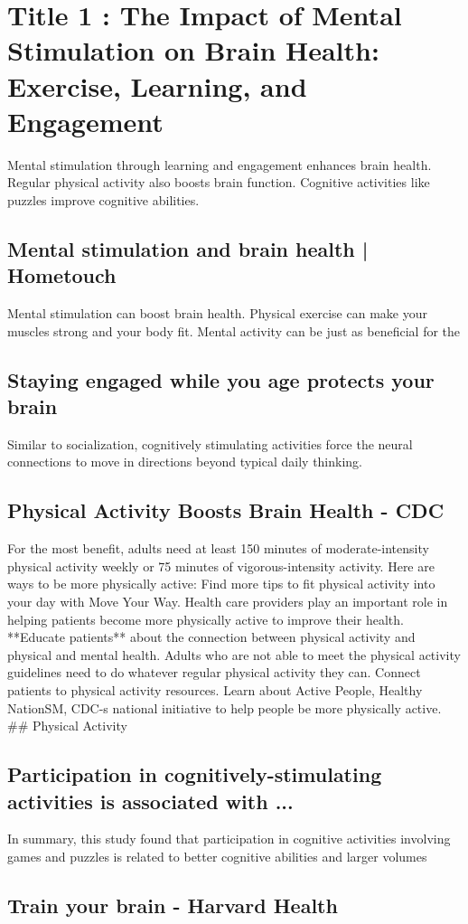 \documentclass[12pt]{article}
\begin{document}
\section{Title 1 : The Impact of Mental Stimulation on Brain Health: Exercise, Learning, and Engagement}
Mental stimulation through learning and engagement enhances brain health. Regular physical activity also boosts brain function. Cognitive activities like puzzles improve cognitive abilities.\subsection{Mental stimulation and brain health | Hometouch}
Mental stimulation can boost brain health. Physical exercise can make your muscles strong and your body fit. Mental activity can be just as beneficial for the\subsection{Staying engaged while you age protects your brain}
Similar to socialization, cognitively stimulating activities force the neural connections to move in directions beyond typical daily thinking.\subsection{Physical Activity Boosts Brain Health - CDC}
For the most benefit, adults need at least 150 minutes of moderate-intensity physical activity weekly or 75 minutes of vigorous-intensity activity. Here are ways to be more physically active: Find more tips to fit physical activity into your day with Move Your Way. Health care providers play an important role in helping patients become more physically active to improve their health. **Educate patients** about the connection between physical activity and physical and mental health. Adults who are not able to meet the physical activity guidelines need to do whatever regular physical activity they can. Connect patients to physical activity resources. Learn about Active People, Healthy NationSM, CDC-s national initiative to help people be more physically active. \#\# Physical Activity\subsection{Participation in cognitively-stimulating activities is associated with ...}
In summary, this study found that participation in cognitive activities involving games and puzzles is related to better cognitive abilities and larger volumes\subsection{Train your brain - Harvard Health}
\end{document}
